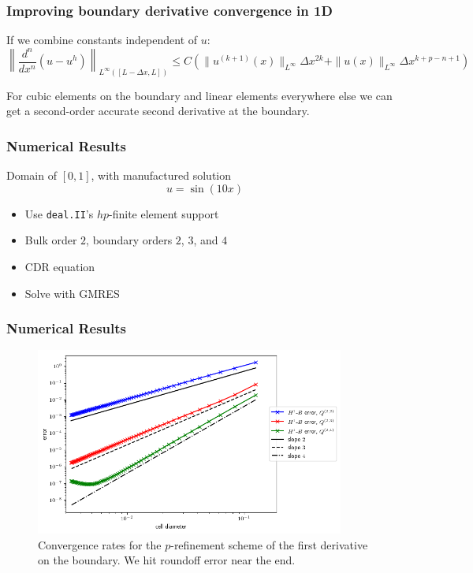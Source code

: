 \documentclass[8pt]{beamer}
\begin{document}
\begin{frame}
    \frametitle{Improving boundary derivative convergence in 1D}
    If we combine constants independent of \(u\):
    \begin{equation*}
        \left\|\dfrac{d^n}{dx^n}(u - u^h)\right\|_{L^\infty([L - \Delta x, L])}
        \leq
        C
        \left(
        \|u^{(k + 1)}(x)\|_{L^\infty}
        \Delta x^{2 k}
        +
        \|u(x)\|_{L^\infty} \Delta x^{k + p - n + 1}
        \right)
    \end{equation*}

    For cubic elements on the boundary and linear elements everywhere else we
    can get a second-order accurate second derivative at the boundary.
\end{frame}

\begin{frame}
    \frametitle{Numerical Results}
    Domain of \([0, 1]\), with manufactured solution
    \begin{equation*}
        u = \sin(10 x)
    \end{equation*}
    \begin{itemize}
        \item Use \texttt{deal.II}'s \(hp\)-finite element support
        \item Bulk order \(2\), boundary orders \(2\), \(3\), and \(4\)
        \item CDR equation
        \item Solve with GMRES
    \end{itemize}
\end{frame}

\begin{frame}
    \frametitle{Numerical Results}
    \begin{figure}
        \centering
        \includegraphics[width=4in]{Pictures/oned-cdr-2-h1-errors.png}

        \caption{Convergence rates for the \(p\)-refinement scheme of the
        first derivative on the boundary. We hit roundoff error near the end.}
    \end{figure}
\end{frame}
\end{document}
